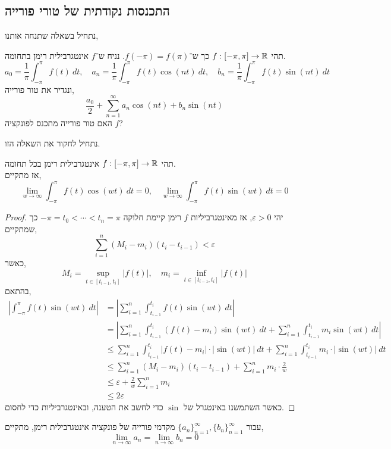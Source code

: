 \subsection{התכנסות נקודתית של טורי פורייה}
נתחיל בשאלה שתנחה אותנו,
\begin{exercise}
	תהי $f : [-\pi, \pi] \to \mathbb{R}$ כך ש־$f(-\pi) = f(\pi)$.
	נניח ש־$f$ אינטגרבילית רימן בתחומה.
	\[
		a_0 = \frac{1}{\pi} \int_{-\pi}^{\pi} f(t)\ dt,
		\quad
		a_n = \frac{1}{\pi} \int_{-\pi}^{\pi} f(t) \cos(nt)\ dt,
		\quad
		b_n = \frac{1}{\pi} \int_{-\pi}^{\pi} f(t) \sin(nt)\ dt
	\]
	ונגדיר את טור פורייה,
	\[
		\frac{a_0}{2} + \sum_{n = 1}^\infty a_n \cos(nt) + b_n \sin(nt)
	\]
	האם טור פורייה מתכנס לפונקציה $f$?
\end{exercise}
נתחיל לחקור את השאלה הזו.
\begin{lemma}
	תהי $f : [-\pi, \pi] \to \mathbb{R}$ אינטגרבילית רימן בכל תחומה. \\
	אז מתקיים,
	\[
		\lim_{w \to \infty} \int_{-\pi}^{\pi} f(t) \cos(w t)\ dt = 0,
		\quad
		\lim_{w \to \infty} \int_{-\pi}^{\pi} f(t) \sin(w t)\ dt = 0
	\]
\end{lemma}
\begin{proof}
	יהי $\varepsilon > 0$, אז מאינטגרביליות $f$ רימן קיימת חלוקה $-\pi = t_0 < \cdots < t_n = \pi$ כך שמתקיים,
	\[
		\sum_{i = 1}^n (M_i - m_i) (t_i - t_{i - 1})
		< \varepsilon
	\]
	כאשר,
	\[
		M_i = \sup_{t \in [t_{i - 1}, t_i]} |f(t)|,
		\quad
		m_i = \inf_{t \in [t_{i - 1}, t_i]} |f(t)|
	\]
	בהתאם,
	\begin{align*}
		\left\lvert \int_{-\pi}^{\pi} f(t) \sin(wt)\ dt \right\rvert
		& = \left\lvert \sum_{i = 1}^n \int_{t_{i - 1}}^{t_i} f(t) \sin(wt)\ dt \right\rvert \\
		& = \left\lvert \sum_{i = 1}^n \int_{t_{i - 1}}^{t_i} (f(t) - m_i) \sin(wt)\ dt + \sum_{i = 1}^n \int_{t_{i - 1}}^{t_i} m_i \sin(wt)\ dt \right\rvert \\
		& \le \sum_{i = 1}^n \int_{t_{i - 1}}^{t_i} |f(t) - m_i| \cdot |\sin(wt)|\ dt + \sum_{i = 1}^n \int_{t_{i - 1}}^{t_i} m_i \cdot |\sin(wt)|\ dt  \\
		& \le \sum_{i = 1}^n (M_i - m_i) (t_i - t_{i - 1}) + \sum_{i = 1}^n m_i \cdot \frac{2}{w} \\
		& \le \varepsilon + \frac{2}{w} \sum_{i = 1}^n m_i \\
		& \le 2\varepsilon
	\end{align*}
	כאשר השתמשנו באינטגרל של $\sin$ כדי לחשב את הטענה, ובאינטגרביליות כדי לחסום.
\end{proof}
\begin{corollary}
	עבור ${\{ a_n \}}_{n = 1}^\infty, {\{ b_n \}}_{n = 1}^\infty$ מקדמי פורייה של פונקציה אינטגרבילית רימן, מתקיים,
	\[
		\lim_{n \to \infty} a_n
		= \lim_{n \to \infty} b_n
		= 0
	\]
\end{corollary}
